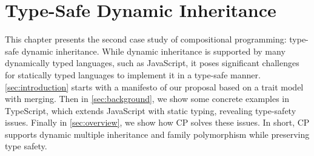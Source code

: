 \chapter{Type-Safe Dynamic Inheritance} \label{ch:inheritance}

This chapter presents the second case study of compositional programming:
type-safe dynamic inheritance. While dynamic inheritance is supported by many
dynamically typed languages, such as JavaScript, it poses significant challenges
for statically typed languages to implement it in a type-safe manner.
\autoref{sec:introduction} starts with a manifesto of our proposal based on a
trait model with merging. Then in \autoref{sec:background}, we show some
concrete examples in TypeScript, which extends JavaScript with static typing,
revealing type-safety issues. Finally in \autoref{sec:overview}, we show how CP
solves these issues. In short, CP supports dynamic multiple inheritance and
family polymorphism while preserving type safety.




